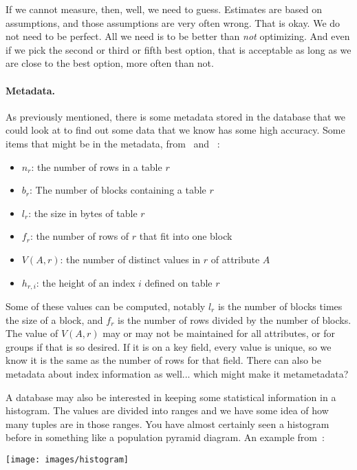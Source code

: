If we cannot measure, then, well, we need to guess. Estimates are based on assumptions, and those assumptions are very often wrong. That is okay. We do not need to be perfect. All we need is to be better than \textit{not} optimizing. And even if we pick the second or third or fifth best option, that is acceptable as long as we are close to the best option, more often than not.

\paragraph{Metadata.} As previously mentioned, there is some metadata stored in the database that we could look at to find out some data that we know has some high accuracy. Some items that might be in the metadata, from~\cite{dsc} and ~\cite{fds}:

\begin{itemize}
	\item $n_{r}$: the number of rows in a table $r$ 
	\item $b_{r}$: The number of blocks containing a table $r$ 
	\item $l_{r}$: the size in bytes of table $r$
	\item $f_{r}$: the number of rows of $r$ that fit into one block
	\item $V(A, r)$: the number of distinct values in $r$ of attribute $A$
	\item $h_{r, i}$: the height of an index $i$ defined on table $r$
\end{itemize}

Some of these values can be computed, notably $l_{r}$ is the number of blocks times the size of a block, and $f_{r}$ is the number of rows divided by the number of blocks. The value of $V(A, r)$ may or may not be maintained for all attributes, or for groups if that is so desired. If it is on a key field, every value is unique, so we know it is the same as the number of rows for that field. There can also be metadata about index information as well... which might make it metametadata? 

A database may also be interested in keeping some statistical information in a histogram. The values are divided into ranges and we have some idea of how many tuples are in those ranges. You have almost certainly seen a histogram before in something like a population pyramid diagram. An example from~\cite{dsc}:

\begin{center}
\texttt{[image: images/histogram]}
\end{center}

